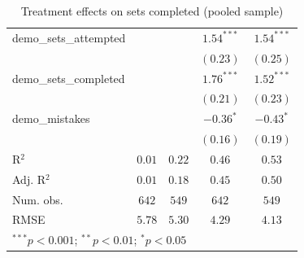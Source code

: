 \documentclass[
  12,
  letterpaper,
  DIV=11,
  numbers=noendperiod]{scrartcl}
\begin{document}
\begin{table}
{\begin{center}
\begin{tabular}{l c c c c}
demo\_sets\_attempted           &               &               & $1.54^{***}$ & $1.54^{***}$  \\
                                &               &               & $(0.23)$     & $(0.25)$      \\
demo\_sets\_completed           &               &               & $1.76^{***}$ & $1.52^{***}$  \\
                                &               &               & $(0.21)$     & $(0.23)$      \\
demo\_mistakes                  &               &               & $-0.36^{*}$  & $-0.43^{*}$   \\
                                &               &               & $(0.16)$     & $(0.19)$      \\
\hline
R$^2$                           & $0.01$        & $0.22$        & $0.46$       & $0.53$        \\
Adj. R$^2$                      & $0.01$        & $0.18$        & $0.45$       & $0.50$        \\
Num. obs.                       & $642$         & $549$         & $642$        & $549$         \\
RMSE                            & $5.78$        & $5.30$        & $4.29$       & $4.13$        \\
\hline
\multicolumn{5}{l}{\tiny{$^{***}p<0.001$; $^{**}p<0.01$; $^{*}p<0.05$}}
\end{tabular}
\label{table:coefficients}
\end{center}

}

\caption{\label{tbl-reg-sets-full}Treatment effects on sets completed
(pooled sample)}

\end{table}%
\end{document}

